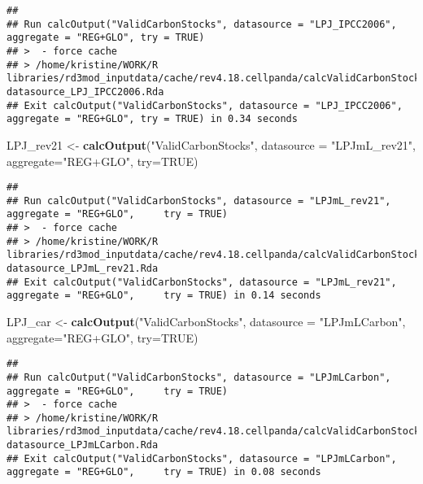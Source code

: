 \documentclass[
]{article}
\newenvironment{Shaded}{\begin{snugshade}}{\end{snugshade}}
\newcommand{\DataTypeTok}[1]{\textcolor[rgb]{0.13,0.29,0.53}{#1}}
\newcommand{\KeywordTok}[1]{\textcolor[rgb]{0.13,0.29,0.53}{\textbf{#1}}}
\newcommand{\NormalTok}[1]{#1}
\newcommand{\OtherTok}[1]{\textcolor[rgb]{0.56,0.35,0.01}{#1}}
\newcommand{\StringTok}[1]{\textcolor[rgb]{0.31,0.60,0.02}{#1}}
\begin{document}
\begin{verbatim}
## 
## Run calcOutput("ValidCarbonStocks", datasource = "LPJ_IPCC2006",     aggregate = "REG+GLO", try = TRUE)
## >  - force cache 
## > /home/kristine/WORK/R libraries/rd3mod_inputdata/cache/rev4.18.cellpanda/calcValidCarbonStocks-datasource_LPJ_IPCC2006.Rda
## Exit calcOutput("ValidCarbonStocks", datasource = "LPJ_IPCC2006",     aggregate = "REG+GLO", try = TRUE) in 0.34 seconds
\end{verbatim}

\begin{Shaded}
\begin{Highlighting}[]
\NormalTok{  LPJ\_rev21  <{-}}\StringTok{ }\KeywordTok{calcOutput}\NormalTok{(}\StringTok{"ValidCarbonStocks"}\NormalTok{, }\DataTypeTok{datasource =} \StringTok{"LPJmL\_rev21"}\NormalTok{, }\DataTypeTok{aggregate=}\StringTok{"REG+GLO"}\NormalTok{, }\DataTypeTok{try=}\OtherTok{TRUE}\NormalTok{)}
\end{Highlighting}
\end{Shaded}

\begin{verbatim}
## 
## Run calcOutput("ValidCarbonStocks", datasource = "LPJmL_rev21", aggregate = "REG+GLO",     try = TRUE)
## >  - force cache 
## > /home/kristine/WORK/R libraries/rd3mod_inputdata/cache/rev4.18.cellpanda/calcValidCarbonStocks-datasource_LPJmL_rev21.Rda
## Exit calcOutput("ValidCarbonStocks", datasource = "LPJmL_rev21", aggregate = "REG+GLO",     try = TRUE) in 0.14 seconds
\end{verbatim}

\begin{Shaded}
\begin{Highlighting}[]
\NormalTok{  LPJ\_car    <{-}}\StringTok{ }\KeywordTok{calcOutput}\NormalTok{(}\StringTok{"ValidCarbonStocks"}\NormalTok{, }\DataTypeTok{datasource =} \StringTok{"LPJmLCarbon"}\NormalTok{, }\DataTypeTok{aggregate=}\StringTok{"REG+GLO"}\NormalTok{, }\DataTypeTok{try=}\OtherTok{TRUE}\NormalTok{)}
\end{Highlighting}
\end{Shaded}

\begin{verbatim}
## 
## Run calcOutput("ValidCarbonStocks", datasource = "LPJmLCarbon", aggregate = "REG+GLO",     try = TRUE)
## >  - force cache 
## > /home/kristine/WORK/R libraries/rd3mod_inputdata/cache/rev4.18.cellpanda/calcValidCarbonStocks-datasource_LPJmLCarbon.Rda
## Exit calcOutput("ValidCarbonStocks", datasource = "LPJmLCarbon", aggregate = "REG+GLO",     try = TRUE) in 0.08 seconds
\end{verbatim}
\end{document}
